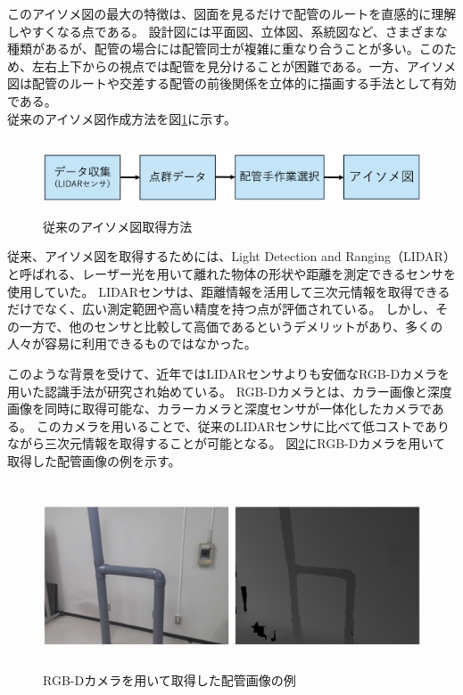 このアイソメ図の最大の特徴は、図面を見るだけで配管のルートを直感的に理解しやすくなる点である。
設計図には平面図、立体図、系統図など、さまざまな種類があるが、配管の場合には配管同士が複雑に重なり合うことが多い。このため、左右上下からの視点では配管を見分けることが困難である。一方、アイソメ図は配管のルートや交差する配管の前後関係を立体的に描画する手法として有効である。\\
従来のアイソメ図作成方法を図\ref{fig:f2}に示す。
\begin{figure}[htbt]
	\centering
	 \includegraphics[height=22mm]{Figure/existing_research.eps}
	 \caption{従来のアイソメ図取得方法}
	 \label{fig:f2}
\end{figure}

従来、アイソメ図を取得するためには、Light Detection and Ranging（LIDAR）と呼ばれる、レーザー光を用いて離れた物体の形状や距離を測定できるセンサを使用していた。
LIDARセンサは、距離情報を活用して三次元情報を取得できるだけでなく、広い測定範囲や高い精度を持つ点が評価されている。
しかし、その一方で、他のセンサと比較して高価であるというデメリットがあり、多くの人々が容易に利用できるものではなかった。

このような背景を受けて、近年ではLIDARセンサよりも安価なRGB-Dカメラを用いた認識手法が研究され始めている。
RGB-Dカメラとは、カラー画像と深度画像を同時に取得可能な、カラーカメラと深度センサが一体化したカメラである。
このカメラを用いることで、従来のLIDARセンサに比べて低コストでありながら三次元情報を取得することが可能となる。
図\ref{fig:f3}にRGB-Dカメラを用いて取得した配管画像の例を示す。
\begin{figure}[htbt]
	\centering
	 \includegraphics[height=55mm]{Figure/ex_pipe.eps}
	 \caption{RGB-Dカメラを用いて取得した配管画像の例}
	 \label{fig:f3}
\end{figure}

